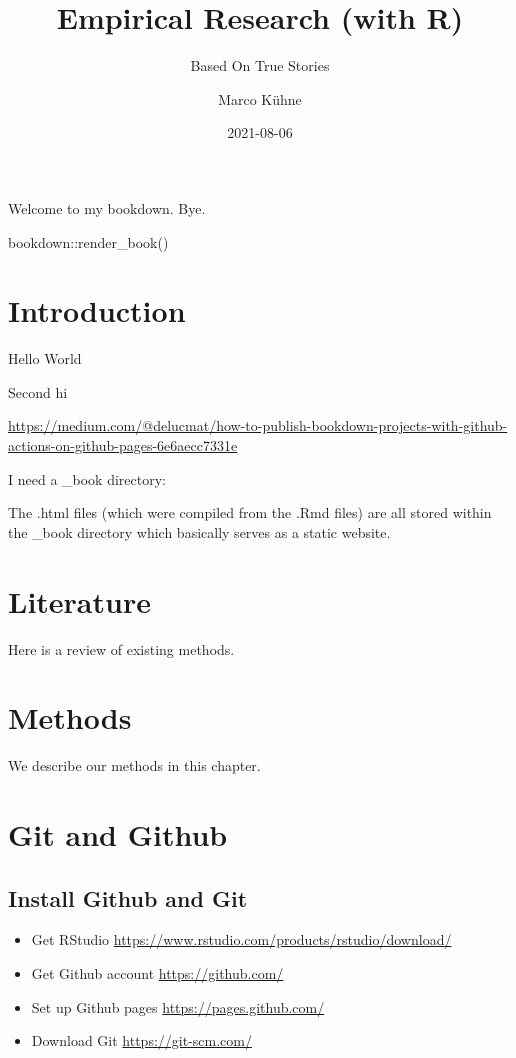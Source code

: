 \documentclass[
]{book}
\title{Empirical Research (with R)}
\subtitle{Based On True Stories}
\author{Marco Kühne}
\date{2021-08-06}
\providecommand{\tightlist}{%
  \setlength{\itemsep}{0pt}\setlength{\parskip}{0pt}}
\begin{document}
\maketitle

{
\setcounter{tocdepth}{1}
\tableofcontents
}
Welcome to my bookdown. Bye.

bookdown::render\_book()

\hypertarget{introduction}{%
\chapter{Introduction}\label{introduction}}

Hello World

Second hi

\url{https://medium.com/@delucmat/how-to-publish-bookdown-projects-with-github-actions-on-github-pages-6e6aecc7331e}

I need a \_book directory:

The .html files (which were compiled from the .Rmd files) are all stored within the \_book directory which basically serves as a static website.

\hypertarget{literature}{%
\chapter{Literature}\label{literature}}

Here is a review of existing methods.

\hypertarget{methods}{%
\chapter{Methods}\label{methods}}

We describe our methods in this chapter.

\hypertarget{git-and-github}{%
\chapter{Git and Github}\label{git-and-github}}

\hypertarget{install-github-and-git}{%
\section{Install Github and Git}\label{install-github-and-git}}

\begin{itemize}
\tightlist
\item
  Get RStudio \url{https://www.rstudio.com/products/rstudio/download/}
\item
  Get Github account \url{https://github.com/}
\item
  Set up Github pages \url{https://pages.github.com/}
\item
  Download Git \url{https://git-scm.com/}
\end{itemize}
\end{document}
